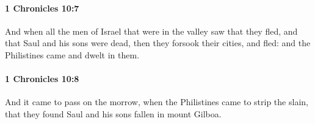 		\paragraph{1 Chronicles 10:7} %
			\label{1CHRONICLES-10-7}

			And when all the men of Israel that were in the valley saw that they fled, and that Saul and his sons were dead, then they forsook their cities, and fled: and the Philistines came and dwelt in them.


		\paragraph{1 Chronicles 10:8} %
			\label{1CHRONICLES-10-8}

			And it came to pass on the morrow, when the Philistines came to strip the slain, that they found Saul and his sons fallen in mount Gilboa.


